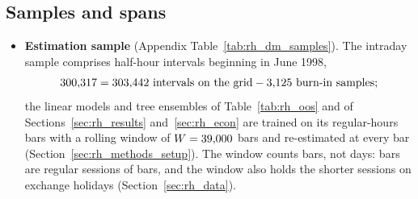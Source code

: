 \subsection{Samples and spans}
\label{app:rh_results_setup}
\begin{itemize}
\item \textbf{Estimation sample} (Appendix Table~\ref{tab:rh_dm_samples}). The intraday sample comprises
  \rhdmPooledRows{} half-hour intervals beginning in June 1998,
  \[
    300{,}317 = 303{,}442 \text{ intervals on the grid} - 3{,}125 \text{ burn-in samples};
  \]
  the linear models and tree ensembles of Table~\ref{tab:rh_oos} and of Sections~\ref{sec:rh_results}
  and~\ref{sec:rh_econ} are trained on its \rhorNBars{} regular-hours bars with a rolling window of
  $W = 39{,}000$ bars and re-estimated at every bar (Section~\ref{sec:rh_methods_setup}). The window counts bars,
  not days: \rhorWindowBars{} bars are \rhorWindowDays{} regular sessions of \rhorNBars{} bars, and the window also
  holds the shorter sessions on exchange holidays (Section~\ref{sec:rh_data}).

\end{itemize}
